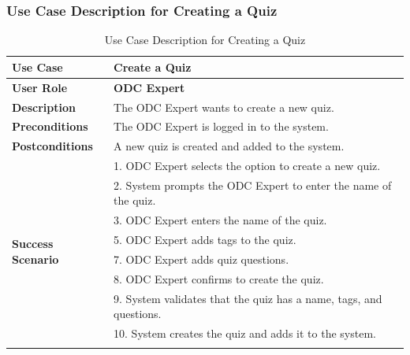 \subsubsection{Use Case Description for Creating a Quiz}
\begin{longtable}{|p{3cm}|p{12cm}|}
  \hline
  \rowcolor{green!20} \textbf{Use Case}       & \textbf{Create a Quiz}                                             \\ \hline
  \textbf{User Role}                          & \textbf{ODC Expert}                                                \\ \hline
  \textbf{Description}                        & The ODC Expert wants to create a new quiz.                         \\ \hline
  \textbf{Preconditions}                      & The ODC Expert is logged in to the system.                         \\ \hline
  \textbf{Postconditions}                     & A new quiz is created and added to the system.                     \\ \hline
  \multirow{10}{*}{\textbf{Success Scenario}} &
  1. ODC Expert selects the option to create a new quiz.                                                           \\ \cline{2-2}
                                              & 2. System prompts the ODC Expert to enter the name of the quiz.    \\ \cline{2-2}
                                              & 3. ODC Expert enters the name of the quiz.                         \\ \cline{2-2}
                                              & 5. ODC Expert adds tags to the quiz.                               \\ \cline{2-2}
                                              & 7. ODC Expert adds quiz questions.                                 \\ \cline{2-2}
                                              & 8. ODC Expert confirms to create the quiz.                         \\ \cline{2-2}
                                              & 9. System validates that the quiz has a name, tags, and questions. \\ \cline{2-2}
                                              & 10. System creates the quiz and adds it to the system.             \\ \hline
  \caption{Use Case Description for Creating a Quiz}\label{tab:create_quiz_use_case}
\end{longtable}

